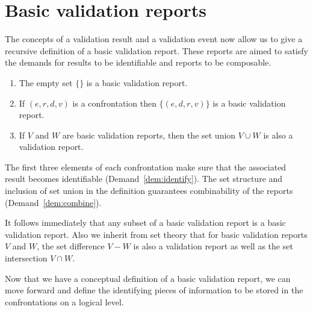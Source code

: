 \section{Basic validation reports}
\label{sect:basicreports}
The concepts of a validation result and a validation event now allow us to give
a recursive definition of a basic validation report. These reports are aimed to
satisfy the demands for results to be identifiable and reports to be
composable.
%
\begin{definition}\leavevmode
\begin{enumerate}[topsep=0pt,itemsep=0pt]
\item The empty set $\{\}$ is a basic validation report.
\item If $(e,r,d,v)$ is a confrontation then $\{(e,d,r,v)\}$ is a basic
validation report.
\item If $V$ and $W$ are basic validation reports, then the set union $V\cup W$
is also a validation report.
\end{enumerate}
\label{def:basicvalidationreport}
\end{definition}
%
The first three elements of each confrontation make sure that the associated
result becomes identifiable (Demand~\ref{dem:identify}). The set structure and
inclusion of set union in the definition guarantees combinability of the
reports (Demand~\ref{dem:combine}).

It follows immediately that any subset of a basic validation report is a basic
validation report. Also we inherit from set theory that for basic validation
reports $V$ and $W$, the set difference $V-W$ is also a validation report as
well as the set intersection $V\cap W$.

Now that we have a conceptual definition of a basic validation report, we can
move forward and define the identifying pieces of information to be stored in
the confrontations on a logical level.


